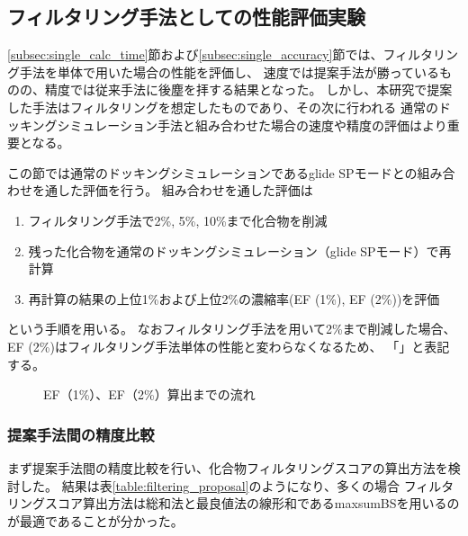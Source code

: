 \subsection{フィルタリング手法としての性能評価実験}
\ref{subsec:single_calc_time}節および\ref{subsec:single_accuracy}節では、フィルタリング手法を単体で用いた場合の性能を評価し、
速度では提案手法が勝っているものの、精度では従来手法に後塵を拝する結果となった。
しかし、本研究で提案した手法はフィルタリングを想定したものであり、その次に行われる
通常のドッキングシミュレーション手法と組み合わせた場合の速度や精度の評価はより重要となる。


この節では通常のドッキングシミュレーションであるglide SPモードとの組み合わせを通した評価を行う。
組み合わせを通した評価は
\begin{enumerate}
\item フィルタリング手法で2\%, 5\%, 10\%まで化合物を削減
\item 残った化合物を通常のドッキングシミュレーション（glide SPモード）で再計算
\item 再計算の結果の上位1\%および上位2\%の濃縮率(EF (1\%), EF (2\%))を評価
\end{enumerate}
という手順を用いる。
なおフィルタリング手法を用いて2\%まで削減した場合、EF (2\%)はフィルタリング手法単体の性能と変わらなくなるため、
「\textendash」と表記する。

\begin{figure}[htp]
 \begin{center}
  \caption{EF（1\%）、EF（2\%）算出までの流れ}
  \label{fig:filtering_image}
 \end{center}
\end{figure}

\subsubsection{提案手法間の精度比較}\label{subsubsec:filtering_proposal}
まず提案手法間の精度比較を行い、化合物フィルタリングスコアの算出方法を検討した。
結果は表\ref{table:filtering_proposal}のようになり、多くの場合
フィルタリングスコア算出方法は総和法と最良値法の線形和であるmaxsumBSを用いるのが最適であることが分かった。


